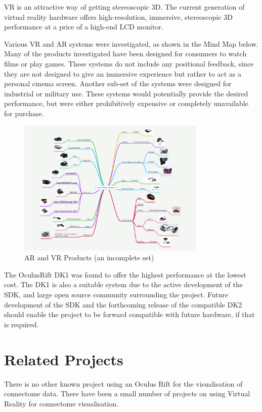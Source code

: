 \documentclass[MSc,paper=a4,pagesize=auto]{icldt}
\begin{document}
VR is an attractive way of getting stereoscopic 3D. The current generation of virtual reality hardware offers high-resolution, immersive, stereoscopic 3D performance at a price of a high-end LCD monitor. 

Various VR and AR systems were investigated, as shown in the Mind Map below. Many of the products investigated have been designed for consumers to watch films or play games. These systems do not include any positional feedback, since they are not designed to give an immersive experience but rather to act as a personal cinema screen. Another sub-set of the systems were designed for industrial or military use. These systems would potentially provide the desired performance, but were either prohibitively expensive or completely unavailable for purchase. 

\begin{figure}[htbp!]
    \centering
    \includegraphics[width=0.8\textwidth]{resources/vr_headsets}
    \caption{AR and VR Products (an incomplete set)}
    \label{fig:vr_headsets}
\end{figure}

The OculusRift DK1 was found to offer the highest performance at the lowest cost. The DK1 is also a suitable system due to the active development of the SDK, and large open source community surrounding the project. Future development of the SDK and the forthcoming release of the compatible DK2 should enable the project to be forward compatible with future hardware, if that is required.
\section{Related Projects}
There is no other known project using an Oculus Rift for the visualisation of connectome data. There have been a small number of projects on using Virtual Reality for connectome visualisation. 
\end{document}
